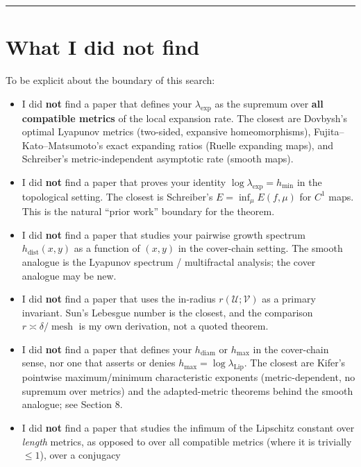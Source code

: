 \documentclass[
]{article}
\providecommand{\tightlist}{%
  \setlength{\itemsep}{0pt}\setlength{\parskip}{0pt}}
\begin{document}
\begin{center}\rule{0.5\linewidth}{0.5pt}\end{center}

\section{What I did not find}\label{what-i-did-not-find}

To be explicit about the boundary of this search:

\begin{itemize}
\tightlist
\item
  I did \textbf{not} find a paper that defines your \(\lambda_{\exp}\)
  as the supremum over \textbf{all compatible metrics} of the local
  expansion rate. The closest are Dovbysh's optimal Lyapunov metrics
  (two-sided, expansive homeomorphisms), Fujita--Kato--Matsumoto's exact
  expanding ratios (Ruelle expanding maps), and Schreiber's
  metric-independent asymptotic rate (smooth maps).
\item
  I did \textbf{not} find a paper that proves your identity
  \(\log\lambda_{\exp}=h_{\min}\) in the topological setting. The
  closest is Schreiber's \(E=\inf_\mu E(f,\mu)\) for \(C^1\) maps. This
  is the natural ``prior work'' boundary for the theorem.
\item
  I did \textbf{not} find a paper that studies your pairwise growth
  spectrum \(h_{\mathrm{dist}}(x,y)\) as a function of \((x,y)\) in the
  cover-chain setting. The smooth analogue is the Lyapunov spectrum /
  multifractal analysis; the cover analogue may be new.
\item
  I did \textbf{not} find a paper that uses the in-radius
  \(r(\mathcal U;\mathcal V)\) as a primary invariant. Sun's Lebesgue
  number is the closest, and the comparison
  \(r\asymp\delta/\operatorname{mesh}\) is my own derivation, not a
  quoted theorem.
\item
  I did \textbf{not} find a paper that defines your
  \(h_{\mathrm{diam}}\) or \(h_{\max}\) in the cover-chain sense, nor
  one that asserts or denies \(h_{\max}=\log\lambda_{\mathrm{Lip}}\).
  The closest are Kifer's pointwise maximum/minimum characteristic
  exponents (metric-dependent, no supremum over metrics) and the
  adapted-metric theorems behind the smooth analogue; see Section 8.
\item
  I did \textbf{not} find a paper that studies the infimum of the
  Lipschitz constant over \emph{length} metrics, as opposed to over all
  compatible metrics (where it is trivially \(\le1\)), over a conjugacy

\end{itemize}
\end{document}
